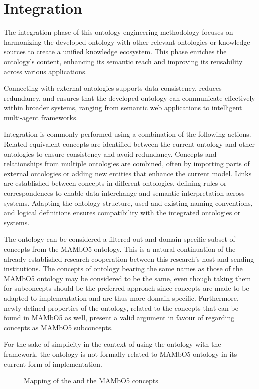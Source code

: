 \chapter{Integration}\label{ch: Integration}

The integration phase of this ontology engineering methodology focuses on harmonizing the developed ontology with other relevant ontologies or knowledge sources to create a unified knowledge ecosystem. This phase enriches the ontology's content, enhancing its semantic reach and improving its reusability across various applications.

Connecting with external ontologies supports data consistency, reduces redundancy, and ensures that the developed ontology can communicate effectively within broader systems, ranging from semantic web applications to intelligent multi-agent frameworks.

Integration is commonly performed using a combination of the following actions. Related equivalent concepts are identified between the current ontology and other ontologies to ensure consistency and avoid redundancy.
Concepts and relationships from multiple ontologies are combined, often by importing parts of external ontologies or adding new entities that enhance the current model.
Links are established between concepts in different ontologies, defining rules or correspondences to enable data interchange and semantic interpretation across systems.
Adapting the ontology structure, used and existing naming conventions, and logical definitions ensures compatibility with the integrated ontologies or systems.

The \magoontologyname ontology can be considered a filtered out and domain-specific subset of concepts from the \ac{MAMbO5} ontology. This is a natural continuation of the already established research cooperation between this research's host and sending institutions. The concepts of \magoontologyname ontology bearing the same names as those of the \ac{MAMbO5} ontology may be considered to be the same, even though taking them for subconcepts should be the preferred approach since \magoontologyname concepts
%
are made to be adapted to implementation and are thus more domain-specific. Furthermore, newly-defined properties of the \magoontologyname ontology, related to the concepts that can be found in \ac{MAMbO5} as well, present a valid argument in favour of regarding \magoontologyname concepts as \ac{MAMbO5} subconcepts.

For the sake of simplicity in the context of using the \magoontologyname ontology with the \magoontologyname framework, the ontology is not formally related to \ac{MAMbO5} ontology in its current form of implementation.

\begin{figure}
    \centering
    
    \caption{Mapping of the \magoontologyname and the MAMbO5 concepts}
    \label{fig: mapping of the mago and the mambo5 concepts}
\end{figure}
